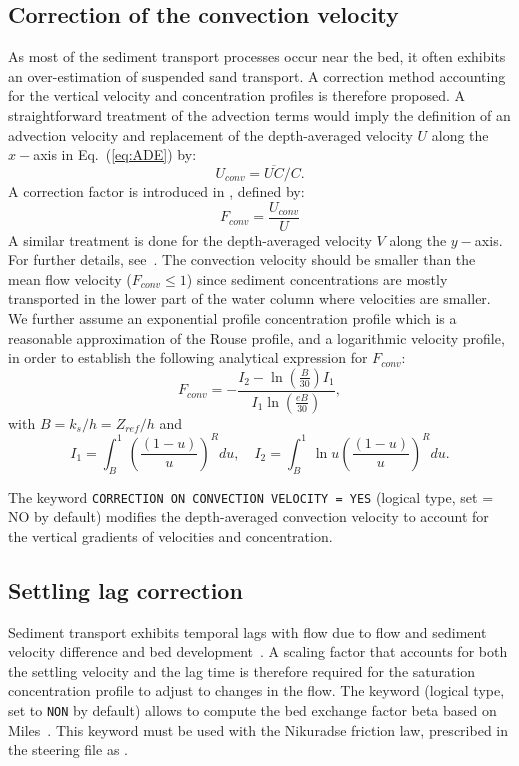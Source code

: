 \subsection{Correction of the convection velocity}
As most of the sediment transport processes occur near the bed, it often exhibits an over-estimation of suspended sand transport.
A correction method accounting for the vertical velocity and concentration profiles is therefore proposed. A straightforward treatment of the advection terms would imply the
definition of an advection velocity and replacement of the depth-averaged
velocity $U$ along the $x-$axis in Eq.~(\ref{eq:ADE}) by:
\begin{equation*}
U_{conv} = \overline{UC}/C.
\end{equation*}
A correction factor is introduced in \sisyphe, defined by:
\begin{equation*}
F_{conv} =\frac{U_{conv}}{U} 
\end{equation*}
A similar treatment is done for the depth-averaged velocity $V$ along the $y-$axis. For further details, see~\cite{Huybrechts}.
The convection velocity should be smaller than the mean flow velocity ($F_{conv} \leq 1$) since sediment concentrations are mostly transported in the lower part of the water column where velocities are smaller. We further
assume an exponential profile concentration profile which is a reasonable
approximation of the Rouse profile, and a logarithmic velocity profile, in
order to establish the following analytical expression for $F_{conv}$:
\begin{equation*}
F_{conv} =-\frac{I_2 - \ln\left(\frac{B}{30}\right) I_1}{I_1 \ln\left( 
\frac{eB}{30}\right)}, 
\end{equation*}
with $B=k_s/h = Z_{ref}/h$ and 
\begin{equation*}
I_1 =\int_B^1\left(\frac{(1-u)}{u}\right)^R du,\quad I_2 = \int_B^1 \ln u \left(\frac{(1-u)}{u} \right)^R du.  
\end{equation*}

The keyword \texttt{CORRECTION ON CONVECTION VELOCITY = YES} (logical type, set {\ttfamily = NO} by default) modifies the depth-averaged convection velocity to account for the vertical gradients of velocities and concentration.

\subsection{Settling lag correction}
Sediment transport exhibits temporal lags with flow due to flow and sediment velocity difference and bed development~\cite{wu2007computational, Miles96}. A scaling factor that accounts for both the settling velocity and the lag time is therefore required for the saturation concentration profile to adjust to changes in the flow.
The keyword  (logical type, set to \texttt{NON} by default) allows to compute the bed exchange factor beta based on Miles~\cite{Miles96}. This keyword must be used with the Nikuradse friction law, prescribed in the  steering file as .

